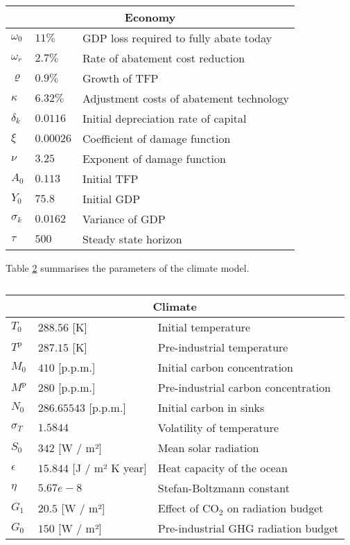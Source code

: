 \documentclass[../../main.tex]{subfiles}
\begin{document}
\begin{table}[htbp] 
    \centering
    \begin{tabular}{ |p{1cm}||p{3cm}|p{8cm}|}
        \hline
        \multicolumn{3}{|c|}{Economy} \\
        \hline
        $\omega_0$ & $11 \%$ & GDP loss required to fully abate today\\
        $\omega_r$ & $2.7 \%$ & Rate of abatement cost reduction \\
        $\varrho$ & $0.9 \%$ & Growth of TFP \\
        $\kappa$ & $6.32 \%$ & Adjustment costs of abatement technology \\
        $\delta_k$ & $0.0116$ & Initial depreciation rate of capital \\
        $\xi$ & $0.00026$ & Coefficient of damage function \\
        $\nu$ & $3.25$ & Exponent of damage function \\
        $A_0$ & $0.113$ & Initial TFP \\
        $Y_0$ & $75.8$ & Initial GDP \\
        $\sigma_k$ & $0.0162$ & Variance of GDP \\
        $\tau$ & $500$ & Steady state horizon  \\
        \hline
    \end{tabular}
    \caption{}
    \label{table:economy}
\end{table}

Table \ref{table:climate} summarises the parameters of the climate model.

\begin{table}[htbp]
    \centering
    \begin{tabular}{ |p{1cm}||p{4cm}|p{7cm}|}
        \hline
        \multicolumn{3}{|c|}{Climate} \\
        \hline
        $T_0$ & $288.56$ [K] & Initial temperature \\
        $T^{\mathrm{p}}$ & $287.15$ [K] & Pre-industrial temperature \\
        $M_0$ & $410$ [p.p.m.] & Initial carbon concentration \\
        $M^{\mathrm{p}}$ & $280$ [p.p.m.] & Pre-industrial carbon concentration \\
        $N_0$ & $286.65543$ [p.p.m.] & Initial carbon in sinks \\
        $\sigma_T$ & $1.5844$ & Volatility of temperature \\
        $S_0$ & $342$ [W / m²] & Mean solar radiation \\
        $\epsilon$ & $15.844$ [J / m² K year] & Heat capacity of the ocean \\
        $\eta$ & $5.67e-8$ & Stefan-Boltzmann constant  \\
        $G_1$ & $20.5$ [W / m²] & Effect of CO$_2$ on radiation budget \\
        $G_0$ & $150$ [W / m²] & Pre-industrial GHG radiation budget \\
        \hline
    \end{tabular}
    \caption{}
    \label{table:climate}
\end{table}
\end{document}
